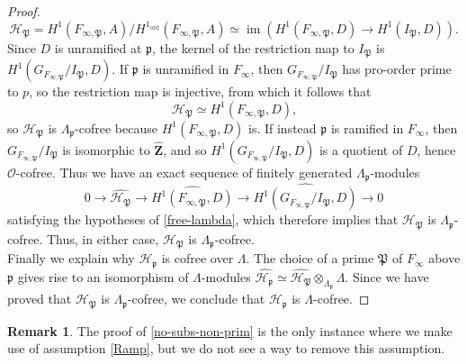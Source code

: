 \documentclass[12 pt]{amsart}
\theoremstyle{plain}
\theoremstyle{definition}
\newtheorem{rem}[thm]{Remark}
\numberwithin{equation}{section}
\numberwithin{table}{section}
\begin{document}
\begin{proof}
\begin{equation*}
\mathcal{H}_\mathfrak{P}=H^1(F_{\infty,\mathfrak{P}},A)/H^1_\operatorname{ord}(F_{\infty,\mathfrak{P}},A)\simeq\operatorname{im}(H^1(F_{\infty,\mathfrak{P}},D)\rightarrow H^1(I_\mathfrak{P},D))\text{.}
\end{equation*}
Since $D$ is unramified at $\mathfrak{p}$, the kernel of the restriction map to $I_\mathfrak{P}$ is $H^1(G_{F_{\infty,\mathfrak{P}}}/I_\mathfrak{P},D)$. If $\mathfrak{p}$ is unramified in $F_\infty$, then $G_{F_{\infty,\mathfrak{P}}}/I_\mathfrak{P}$ has pro-order prime to $p$, so the restriction map is injective, from which it follows that
\begin{equation*}
\mathcal{H}_\mathfrak{P}\simeq H^1(F_{\infty,\mathfrak{P}},D)\text{,}
\end{equation*}
so $\mathcal{H}_\mathfrak{P}$ is $\Lambda_\mathfrak{p}$-cofree because $H^1(F_{\infty,\mathfrak{P}},D)$ is. If instead $\mathfrak{p}$ is ramified in $F_\infty$, then $G_{F_{\infty,\mathfrak{P}}}/I_\mathfrak{P}$ is isomorphic to $\widehat{\mathbf{Z}}$, and so $H^1(G_{F_{\infty,\mathfrak{P}}}/I_\mathfrak{P},D)$ is a quotient of $D$, hence $\mathscr{O}$-cofree. Thus we have an exact sequence of finitely generated $\Lambda_\mathfrak{p}$-modules
\begin{equation*}
0\rightarrow\widehat{\mathcal{H}_\mathfrak{P}}\rightarrow\widehat{H^1(F_{\infty,\mathfrak{P}},D)}\rightarrow
\widehat{H^1(G_{F_{\infty,\mathfrak{P}}}/I_\mathfrak{P},D)}\rightarrow 0
\end{equation*}
satisfying the hypotheses of \cref{free-lambda}, which therefore implies that $\mathcal{H}_\mathfrak{P}$ is $\Lambda_\mathfrak{p}$-cofree. Thus, in either case, $\mathcal{H}_\mathfrak{P}$ is $\Lambda_\mathfrak{p}$-cofree.\\%
\indent Finally we explain why $\mathcal{H}_\mathfrak{p}$ is cofree over $\Lambda$. The choice of a prime $\mathfrak{P}$ of $F_\infty$ above $\mathfrak{p}$ gives rise to an isomorphism of $\Lambda$-modules $\widehat{\mathcal{H}_\mathfrak{p}}\simeq\widehat{\mathcal{H}_\mathfrak{P}}\otimes_{\Lambda_\mathfrak{p}}\Lambda$. Since we have proved that $\mathcal{H}_\mathfrak{P}$ is $\Lambda_\mathfrak{p}$-cofree, we conclude that $\mathcal{H}_\mathfrak{p}$ is $\Lambda$-cofree.
\end{proof}
\begin{rem}
The proof of \cref{no-subs-non-prim} is the only instance where we make use of assumption \cref{Ramp}, but we do not see a way to remove this assumption.
\end{rem}
\end{document}
